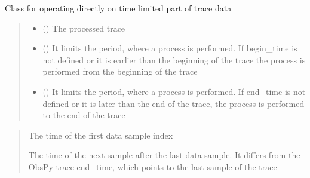 \documentclass[letterpaper,10pt,english]{sphinxmanual}
\begin{document}
\begin{fulllineitems}
\label{\detokenize{api_core:amw.core.utils.IndexTrace}}
\pysigstartsignatures
{}
\pysigstopsignatures
\sphinxAtStartPar
Class for operating directly on time limited part of trace data
\begin{quote}\begin{description}
\begin{itemize}
\item {} 
\sphinxAtStartPar
{} () \textendash{} The processed trace

\item {} 
\sphinxAtStartPar
{} () \textendash{} It limits the period, where a process is performed.
If begin\_time is not defined or it is earlier than the beginning of the trace
the process is performed from the beginning of the trace

\item {} 
\sphinxAtStartPar
{} () \textendash{} It limits the period, where a process is performed.
If end\_time is not defined or it is later than the end of the trace,
the process is performed to the end of the trace

\end{itemize}

\end{description}\end{quote}

\sphinxAtStartPar
{}
\begin{quote}\begin{description}
\sphinxAtStartPar
The time of the first data sample index

\sphinxAtStartPar
The time of the next sample after the last data sample.
It differs from the ObsPy trace end\_time, which points to the last sample of the trace


\end{description}
\end{quote}
\end{fulllineitems}
\end{document}

